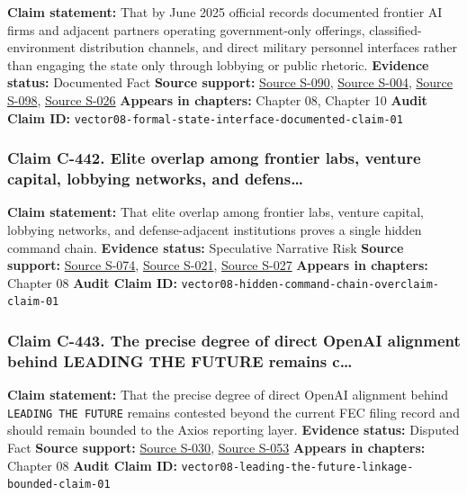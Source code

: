 \documentclass[
  american,
  11pt,
  letterpaper,
]{article}
\begin{document}
\textbf{Claim statement:} That by June 2025 official records documented
frontier AI firms and adjacent partners operating government-only
offerings, classified-environment distribution channels, and direct
military personnel interfaces rather than engaging the state only
through lobbying or public rhetoric. \textbf{Evidence status:}
Documented Fact \textbf{Source support:}
\hyperref[source-s-090-introducing-openai-for-government]{Source S-090},
\hyperref[source-s-004-claude-gov-models-for-u-s-national-security-customers]{Source
S-004},
\hyperref[source-s-098-anthropic-and-palantir-partner-to-bring-claude-ai-models-to-aws-for-u-s-government-intelligence-and-defense-operations]{Source
S-098},
\hyperref[source-s-026-army-launches-detachment-201-executive-innovation-corps-to-drive-tech-transformation]{Source
S-026} \textbf{Appears in chapters:} Chapter 08, Chapter 10
\textbf{Audit Claim ID:}
\texttt{vector08-formal-state-interface-documented-claim-01}

\subsubsection{Claim C-442. Elite overlap among frontier labs, venture
capital, lobbying networks, and
defens\ldots{}}\label{claim-c-442-elite-overlap-among-frontier-labs-venture-capital-lobbying-networks-and-defens}

\textbf{Claim statement:} That elite overlap among frontier labs,
venture capital, lobbying networks, and defense-adjacent institutions
proves a single hidden command chain. \textbf{Evidence status:}
Speculative Narrative Risk \textbf{Source support:}
\hyperref[source-s-074-in-q-tel]{Source S-074},
\hyperref[source-s-021-openai-appoints-former-top-us-cyberwarrior-paul-nakasone-to-its-board-of-directors]{Source
S-021},
\hyperref[source-s-027-anthropic-outspends-openai-in-biggest-ever-lobbying-quarter]{Source
S-027} \textbf{Appears in chapters:} Chapter 08 \textbf{Audit Claim ID:}
\texttt{vector08-hidden-command-chain-overclaim-claim-01}

\subsubsection{Claim C-443. The precise degree of direct OpenAI
alignment behind LEADING THE FUTURE remains
c\ldots{}}\label{claim-c-443-the-precise-degree-of-direct-openai-alignment-behind-leading-the-future-remains-c}

\textbf{Claim statement:} That the precise degree of direct OpenAI
alignment behind \texttt{LEADING\ THE\ FUTURE} remains contested beyond
the current FEC filing record and should remain bounded to the Axios
reporting layer. \textbf{Evidence status:} Disputed Fact \textbf{Source
support:}
\hyperref[source-s-030-openai-linked-pac-doubles-down-in-kentucky]{Source
S-030},
\hyperref[source-s-053-leading-the-future-committee-overview]{Source
S-053} \textbf{Appears in chapters:} Chapter 08 \textbf{Audit Claim ID:}
\texttt{vector08-leading-the-future-linkage-bounded-claim-01}
\end{document}
